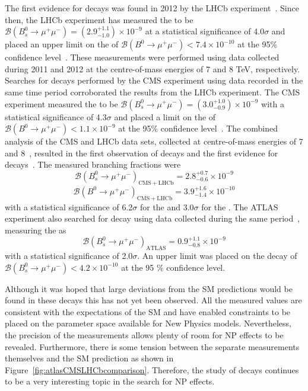 The first evidence for \bsmumu decays was found in 2012 by the LHCb experiment~\cite{Aaij:2012nna}. Since then,
the LHCb experiment has measured the \bsmumu \BF to be $\mathcal{B}(B^{0}_{s} \to \mu^+ \mu^-) = (2.9^{+1.1}_{-1.0})\times 10^{-9}$ at a statistical significance of 4.0$\sigma$ and placed an upper limit on the \bdmumu \BF of $\mathcal{B}(B^{0} \to \mu^+ \mu^-) < 7.4 \times 10^{-10}$ at the 95$\%$ confidence level~\cite{Aaij:2013aka}. These measurements were performed using data collected during 2011 and 2012 at the centre-of-mass energies of 7 and 8 TeV, respectively. Searches for \bmumu decays performed by the CMS experiment using data recorded in the same time period corroborated the results from the LHCb experiment. The CMS experiment measured the \bsmumu \BF to be $\mathcal{B}(B^{0}_{s} \to \mu^+ \mu^-) = (3.0^{+1.0}_{-0.9})\times 10^{-9}$ with a statistical significance of 4.3$\sigma$ and placed a limit on the \bdmumu \BF of $\mathcal{B}(B^{0} \to \mu^+ \mu^-) < 1.1 \times 10^{-9}$ at the 95$\%$ confidence level~\cite{Chatrchyan:2013bka}. 
The combined analysis of the CMS and LHCb data sets, collected at centre-of-mass energies of 7 and 8~\tev, resulted in the first observation of \bsmumu decays and the first evidence for \bdmumu decays~\cite{CMS:2014xfa}. The measured branching fractions were 
\begin{equation}
\mathcal{B}(B^{0}_{s} \to \mu^+ \mu^-)_{\mathrm{CMS + LHCb}}  = 2.8^{+0.7}_{-0.6} \times 10^{-9}
\end{equation}
\begin{equation}
\mathcal{B}(B^{0} \to \mu^+ \mu^-)_{\mathrm{CMS + LHCb}}  = 3.9^{+1.6}_{-1.4} \times 10^{-10}
\end{equation}
with a statistical significance of 6.2$\sigma$ for the \bs and 3.0$\sigma$ for the \bd. The ATLAS experiment also searched for \bmumu decay using data collected during the same period~\cite{Aaboud:2016ire}, measuring the \bsmumu \BF as 
\begin{equation}
\mathcal{B}(B^{0}_{s} \to \mu^+ \mu^-)_{\mathrm{ATLAS}}  = 0.9^{+1.1}_{-0.8} \times 10^{-9}
\end{equation}
with a statistical significance of 2.0$\sigma$. An upper limit was placed on the \bdmumu decay of $\mathcal{B}(B^{0}_{s} \to \mu^+ \mu^-) <4.2 \times 10^{-10}$ at the 95 $\%$ confidence level.

Although it was hoped that large deviations from the SM predictions would be found in these decays this has not yet been observed. 
All the measured values are consistent with the expectations of the SM and have enabled constraints to be placed on the parameter space available for New Physics models. Nevertheless, the precision of the measurements allows plenty of room for NP effects to be revealed. Furthermore, there is some tension between the separate measurements themselves and the SM prediction as shown in Figure~\ref{fig:atlasCMSLHCbcomparison}. Therefore, the study of \bmumu decays continues to be a very interesting topic in the search for NP effects. 
 
